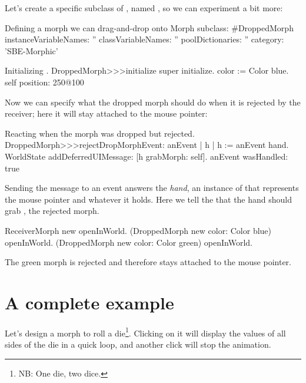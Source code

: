 \documentclass[a4paper,10pt,twoside]{book}
\begin{document}

Let's create a specific subclass of , named , so we can experiment a bit more:

\begin{classdef}{Defining a morph we can drag-and-drop onto }
Morph subclass: #DroppedMorph
	instanceVariableNames: ''
	classVariableNames: ''
	poolDictionaries: ''
	category: 'SBE-Morphic'
\end{classdef}

\begin{method}{Initializing .}
DroppedMorph>>>initialize
	super initialize.
	color := Color blue.
	self position: 250@100
\end{method}

Now we can specify what the dropped morph should do when it is rejected by the receiver; here it will stay attached to the mouse pointer:
\begin{method}{Reacting when the morph was dropped but rejected.}
DroppedMorph>>>rejectDropMorphEvent: anEvent
	| h |
	h := anEvent hand.
	WorldState
		addDeferredUIMessage: [h grabMorph: self].
	anEvent wasHandled: true
\end{method}

Sending the  message to an event answers the \emph{hand}, an instance of  that represents the mouse pointer and whatever it holds.
Here we tell the  that the hand should grab , the rejected morph.

\begin{code}{}
ReceiverMorph new openInWorld.
(DroppedMorph new color: Color blue) openInWorld.
(DroppedMorph new color: Color green) openInWorld.
\end{code}
\noindent
The green morph is rejected and therefore stays attached to the mouse pointer.

\section{A complete example}

Let's design a morph to roll a die\footnote{NB: One die, two dice.}. Clicking on it will display the values of all sides of the die in a quick loop, and another click will stop the animation.
\end{document}
